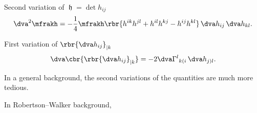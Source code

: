 \documentclass[a4paper,11pt]{article}
\begin{document}
Second variation of $\mfrakh = \det h_{ij}$
\begin{align}
\dva^2 \mfrakh = -\frac{1}{4} \mfrakh \rbr{
h^{ik}h^{jl}+h^{il}h^{kj}-h^{ij}h^{kl}}\,\dva h_{ij}\,\dva h_{kl}.
\end{align}

First variation of $\rbr{\dva h_{ij}}_{|k}$
\begin{align}
\dva\cbr{\rbr{\dva h_{ij}}_{|k}} = -2 \dva\Gamma^l{}_{k(i}\,\dva h_{j)l}.
\end{align}



In a general background, the second variations of the quantities are much more 
tedious.

In Robertson--Walker background, 


\printbibliography
\end{document}
